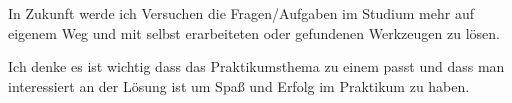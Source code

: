 \documentclass[pdftex,12pt,a4paper]{scrreprt}
\begin{document}
In Zukunft werde ich Versuchen die Fragen/Aufgaben im Studium mehr auf eigenem Weg und mit selbst erarbeiteten oder gefundenen Werkzeugen zu lösen.

Ich denke es ist wichtig dass das Praktikumsthema zu einem passt und dass man interessiert an der Lösung ist um Spaß und Erfolg im Praktikum zu haben.

\appendix

\end{document}

